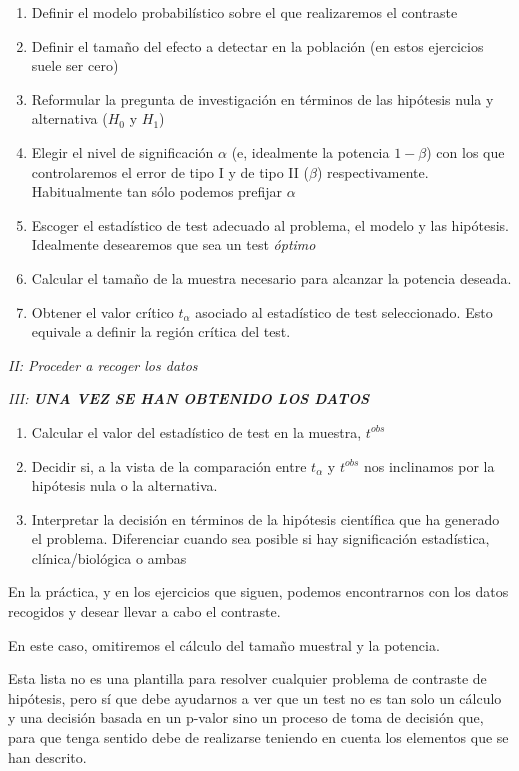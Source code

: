 \documentclass[
]{article}
\begin{document}
\begin{enumerate}
\def\labelenumi{\arabic{enumi}.}
\setcounter{enumi}{-1}
\item
  Definir el modelo probabilístico sobre el que realizaremos el contraste
\item
  Definir el tamaño del efecto a detectar en la población (en estos ejercicios suele ser cero)
\item
  Reformular la pregunta de investigación en términos de las hipótesis nula y alternativa (\(H_0\) y \(H_1\))
\item
  Elegir el nivel de significación \(\alpha\) (e, idealmente la potencia \(1-\beta\)) con los que controlaremos el error de tipo I y de tipo II (\(\beta\)) respectivamente. Habitualmente tan sólo podemos prefijar \(\alpha\)
\item
  Escoger el estadístico de test adecuado al problema, el modelo y las hipótesis. Idealmente desearemos que sea un test \emph{óptimo}
\item
  Calcular el tamaño de la muestra necesario para alcanzar la potencia deseada.
\item
  Obtener el valor crítico \(t_{\alpha}\) asociado al estadístico de test seleccionado. Esto equivale a definir la región crítica del test.
\end{enumerate}

\emph{II: Proceder a recoger los datos}

\emph{III: \textbf{UNA VEZ SE HAN OBTENIDO LOS DATOS}}

\begin{enumerate}
\def\labelenumi{\arabic{enumi}.}
\setcounter{enumi}{6}
\item
  Calcular el valor del estadístico de test en la muestra, \(t^{obs}\)
\item
  Decidir si, a la vista de la comparación entre \(t_{\alpha}\) y \(t^{obs}\) nos inclinamos por la hipótesis nula o la alternativa.
\item
  Interpretar la decisión en términos de la hipótesis científica que ha generado el problema. Diferenciar cuando sea posible si hay significación estadística, clínica/biológica o ambas
\end{enumerate}

En la práctica, y en los ejercicios que siguen, podemos encontrarnos con los datos recogidos y desear llevar a cabo el contraste.

En este caso, omitiremos el cálculo del tamaño muestral y la potencia.

Esta lista no es una plantilla para resolver cualquier problema de contraste de hipótesis, pero sí que debe ayudarnos a ver que un test no es tan solo un cálculo y una decisión basada en un p-valor sino un proceso de toma de decisión que, para que tenga sentido debe de realizarse teniendo en cuenta los elementos que se han descrito.
\end{document}
